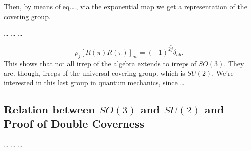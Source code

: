 Then, by means of eq.\dots, via the exponential map we get a representation of the covering group.


\dots
\dots
\dots

\begin{equation}
    \rho_j[R(\pi)R(\pi)]_{ab} = (-1)^{2\tilde{j}} \delta_{ab}.
\end{equation}
This shows that not all irrep of the algebra extends to irreps of $SO(3)$. They are, though, irreps of the universal covering group, which is $SU(2)$. We're interested in this last group in quantum mechanics, since \dots


\subsection{Relation between \texorpdfstring{$SO(3)$}{SO(3)} and \texorpdfstring{$SU(2)$}{SU(2)} and Proof of Double Coverness}
\dots
\dots
\dots
